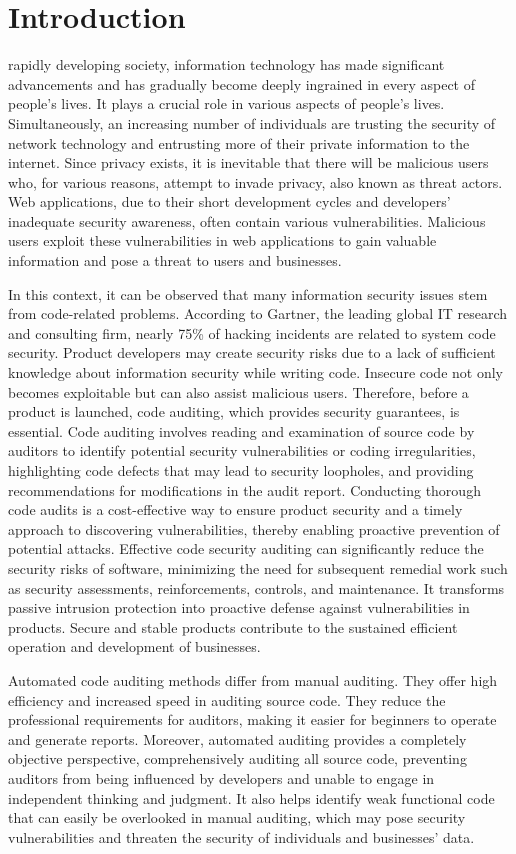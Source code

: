 \documentclass[journal]{IEEEtran}
\begin{document}
\section{Introduction}
\label{sec:intro}
 rapidly developing society, information technology has made significant advancements and has gradually become deeply ingrained in every aspect of people's lives. It plays a crucial role in various aspects of people's lives. Simultaneously, an increasing number of individuals are trusting the security of network technology and entrusting more of their private information to the internet. Since privacy exists, it is inevitable that there will be malicious users who, for various reasons, attempt to invade privacy, also known as threat actors. Web applications, due to their short development cycles and developers' inadequate security awareness, often contain various vulnerabilities. Malicious users exploit these vulnerabilities in web applications to gain valuable information and pose a threat to users and businesses.

In this context, it can be observed that many information security issues stem from code-related problems. According to Gartner, the leading global IT research and consulting firm, nearly 75\% of hacking incidents are related to system code security. Product developers may create security risks due to a lack of sufficient knowledge about information security while writing code. Insecure code not only becomes exploitable but can also assist malicious users. Therefore, before a product is launched, code auditing, which provides security guarantees, is essential. Code auditing involves reading and examination of source code by auditors to identify potential security vulnerabilities or coding irregularities, highlighting code defects that may lead to security loopholes, and providing recommendations for modifications in the audit report. Conducting thorough code audits is a cost-effective way to ensure product security and a timely approach to discovering vulnerabilities, thereby enabling proactive prevention of potential attacks. Effective code security auditing can significantly reduce the security risks of software, minimizing the need for subsequent remedial work such as security assessments, reinforcements, controls, and maintenance. It transforms passive intrusion protection into proactive defense against vulnerabilities in products. Secure and stable products contribute to the sustained efficient operation and development of businesses.

Automated code auditing methods differ from manual auditing. They offer high efficiency and increased speed in auditing source code. They reduce the professional requirements for auditors, making it easier for beginners to operate and generate reports. Moreover, automated auditing provides a completely objective perspective, comprehensively auditing all source code, preventing auditors from being influenced by developers and unable to engage in independent thinking and judgment. It also helps identify weak functional code that can easily be overlooked in manual auditing, which may pose security vulnerabilities and threaten the security of individuals and businesses' data.
\end{document}
